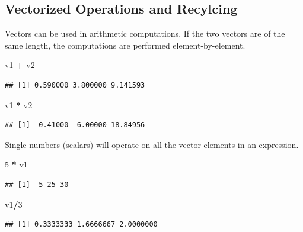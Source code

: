 \documentclass[
]{book}
\newenvironment{Shaded}{\begin{snugshade}}{\end{snugshade}}
\newcommand{\DecValTok}[1]{\textcolor[rgb]{0.00,0.00,0.81}{#1}}
\newcommand{\NormalTok}[1]{#1}
\newcommand{\OperatorTok}[1]{\textcolor[rgb]{0.81,0.36,0.00}{\textbf{#1}}}
\newcommand{\StringTok}[1]{\textcolor[rgb]{0.31,0.60,0.02}{#1}}
\begin{document}
\hypertarget{vecoperators}{%
\subsection{Vectorized Operations and Recylcing}\label{vecoperators}}

Vectors can be used in arithmetic computations. If the two vectors are of the same length, the computations are performed element-by-element.

\begin{Shaded}
\begin{Highlighting}[]
\NormalTok{v1 }\OperatorTok{+}\StringTok{ }\NormalTok{v2}
\end{Highlighting}
\end{Shaded}

\begin{verbatim}
## [1] 0.590000 3.800000 9.141593
\end{verbatim}

\begin{Shaded}
\begin{Highlighting}[]
\NormalTok{v1 }\OperatorTok{*}\StringTok{ }\NormalTok{v2}
\end{Highlighting}
\end{Shaded}

\begin{verbatim}
## [1] -0.41000 -6.00000 18.84956
\end{verbatim}

Single numbers (scalars) will operate on all the vector elements in an expression.

\begin{Shaded}
\begin{Highlighting}[]
\DecValTok{5} \OperatorTok{*}\StringTok{ }\NormalTok{v1}
\end{Highlighting}
\end{Shaded}

\begin{verbatim}
## [1]  5 25 30
\end{verbatim}

\begin{Shaded}
\begin{Highlighting}[]
\NormalTok{v1}\OperatorTok{/}\DecValTok{3}
\end{Highlighting}
\end{Shaded}

\begin{verbatim}
## [1] 0.3333333 1.6666667 2.0000000
\end{verbatim}
\end{document}
